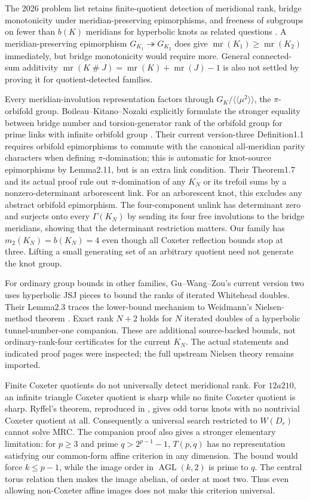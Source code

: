\documentclass[11pt]{article}
\newcommand{\mr}{\operatorname{mr}}
\begin{document}
The 2026 problem list retains finite-quotient detection of meridional
rank, bridge monotonicity under meridian-preserving epimorphisms, and
freeness of subgroups on fewer than $b(K)$ meridians for hyperbolic knots
as related questions \cite{k3}. A meridian-preserving epimorphism
$G_{K_1}\twoheadrightarrow G_{K_2}$ does give
$\mr(K_1)\ge\mr(K_2)$ immediately, but bridge monotonicity would require
more. General connected-sum additivity
$\mr(K\mathbin{\#}J)=\mr(K)+\mr(J)-1$ is also not settled by proving it
for quotient-detected families.

Every meridian-involution representation factors through
$G_K/\langle\!\langle\mu^2\rangle\!\rangle$, the $\pi$-orbifold group.
Boileau--Kitano--Nozaki explicitly formulate the stronger equality between
bridge number and torsion-generator rank of the orbifold group for prime
links with infinite orbifold group \cite[Question8.4]{preorder}.
Their current version-three Definition1.1 requires orbifold
epimorphisms to commute with the canonical all-meridian parity
characters when defining $\pi$-domination; this is automatic for
knot-source epimorphisms by Lemma2.11, but is an extra link condition.
Their Theorem1.7 and its actual proof rule out $\pi$-domination of
any $K_N$ or its trefoil sums by a nonzero-determinant arborescent
link. For an arborescent knot, this excludes any abstract orbifold
epimorphism. The four-component unlink has determinant zero and
surjects onto every $\Gamma(K_N)$ by sending its four free
involutions to the bridge meridians, showing that the determinant
restriction matters. Our family has $m_2(K_N)=b(K_N)=4$ even though
all Coxeter reflection bounds stop at three. Lifting a small
generating set of an arbitrary quotient need not generate the knot group.

For ordinary group bounds in other families, Gu--Wang--Zou's current
version two \cite[Proposition1.3 and Corollaries2.5--2.6]{gwz26}
uses hyperbolic JSJ pieces to bound the ranks of iterated Whitehead
doubles. Their Lemma2.3 traces the lower-bound mechanism to
Weidmann's Nielsen-method theorem \cite[Theorem5]{wei02}.
Exact rank $N+2$ holds for $N$ iterated doubles of a hyperbolic
tunnel-number-one companion. These are additional source-backed
bounds, not ordinary-rank-four certificates for the current $K_N$.
The actual statements and indicated proof pages were inspected;
the full upstream Nielsen theory remains imported.

Finite Coxeter quotients do not universally detect meridional rank.
For $12a210$, an infinite triangle Coxeter quotient is sharp while no
finite Coxeter quotient is sharp. Ryffel's theorem, reproduced in
\cite{bkm}, gives odd torus knots with no nontrivial Coxeter quotient at
all. Consequently a universal search restricted to $W(D_r)$ cannot solve
MRC. The companion proof also gives a stronger elementary limitation:
for $p\ge3$ and prime $q>2^{p-1}-1$, $T(p,q)$ has no representation
satisfying our common-form affine criterion in any dimension. The bound
would force $k\le p-1$, while the image order in $\operatorname{AGL}(k,2)$
is prime to $q$. The central torus relation then makes the image abelian,
of order at most two. Thus even allowing non-Coxeter affine images
does not make this criterion universal.
\end{document}
